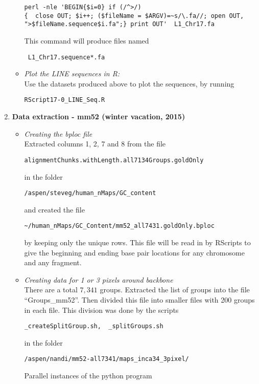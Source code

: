 \documentclass[11pt]{article}
\begin{document}
\begin{enumerate}
\begin{itemize}
\begin{verbatim}
perl -nle 'BEGIN{$i=0} if (/^>/) 
{  close OUT; $i++; ($fileName = $ARGV)=~s/\.fa//; open OUT, 
">$fileName.sequence$i.fa";} print OUT'  L1_Chr17.fa
\end{verbatim}
This command will produce files named \begin{verbatim} L1_Chr17.sequence*.fa \end{verbatim}
\item
\emph{Plot the LINE sequences in R:} \\
Use the datasets produced above to plot the sequences, by running 
\begin{verbatim} 
RScript17-0_LINE_Seq.R 
\end{verbatim} 
\end{itemize}

\item
{\bf{Data extraction - mm52 (winter vacation, 2015)}}
\begin{itemize}
\item \emph{Creating the bploc file} \\
Extracted columns 1, 2, 7 and 8 from the file 
\begin{verbatim}
alignmentChunks.withLength.all7134Groups.goldOnly
\end{verbatim}
in the folder
\begin{verbatim}
/aspen/steveg/human_nMaps/GC_content
\end{verbatim}
and created the file 
\begin{verbatim}
~/human_nMaps/GC_Content/mm52_all7431.goldOnly.bploc
\end{verbatim} 
by keeping only the unique rows. This file will be read in by RScripts to give the beginning and ending base pair locations for any chromosome and any fragment.
\item \emph{Creating data for 1 or 3 pixels around backbone} \\
There are a total $7,341$ groups. Extracted the list of groups into the file ``Groups\_mm52''. Then divided this file into smaller files with 200 groups in each file. This division was done by the scripts 
\begin{verbatim}
_createSplitGroup.sh,  _splitGroups.sh
\end{verbatim}
in the folder 
\begin{verbatim}
/aspen/nandi/mm52-all7341/maps_inca34_3pixel/
\end{verbatim}
Parallel instances of the python program 
\begin{verbatim}

\end{verbatim}
\end{itemize}
\end{enumerate}
\end{document}
